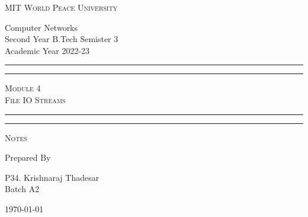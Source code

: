 \documentclass[11pt]{article}
\begin{document}
\begin{titlepage}
	\centering


	\huge\textsc{
		MIT World Peace University
	}\\

	\vspace{0.75\baselineskip} %

	\LARGE{
		Computer Networks\\
		Second Year B.Tech Semister 3\\
		Academic Year 2022-23
	}

	\vfill %


	\rule{\textwidth}{1.6pt}\vspace*{-\baselineskip}\vspace*{2pt}
	\rule{\textwidth}{0.6pt}
	\vspace{0.75\baselineskip} %



	\huge{\textsc{
			Module 4 \\ File IO Streams
		}} \\



	\vspace{0.5\baselineskip} %
	\rule{\textwidth}{0.6pt}\vspace*{-\baselineskip}\vspace*{2.8pt}
	\rule{\textwidth}{1.6pt}

	\vspace{1\baselineskip} %


	\LARGE\textsc{
		Notes
	} %
	\vfill


	Prepared By
	\vspace{0.5\baselineskip} %

	\Large{
		P34. Krishnaraj Thadesar\\
		\vspace{1cm}
		Batch A2
	}


	\vspace{0.5\baselineskip} %
	\today

\end{titlepage}
\end{document}
